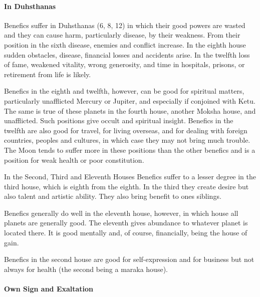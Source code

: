  

\paragraph{In Duhsthanas}

Benefics suffer in Duhsthanas (6, 8, 12) in which their good powers are wasted and they can cause harm, particularly disease, by their weakness. From their position in the sixth disease, enemies and conflict increase. In the eighth house sudden obstacles, disease, financial losses and accidents arise. In the twelfth loss of fame, weakened vitality, wrong generosity, and time in hospitals, prisons, or retirement from life is likely.

 

Benefics in the eighth and twelfth, however, can be good for spiritual matters, particularly unafflicted Mercury or Jupiter, and especially if conjoined with Ketu. The same is true of these planets in the fourth house, another Moksha house, and unafflicted. Such positions give occult and spiritual insight. Benefics in the twelfth are also good for travel, for living overseas, and for dealing with foreign countries, peoples and cultures, in which case they may not bring much trouble. The Moon tends to suffer more in these positions than the other benefics and is a position for weak health or poor constitution.

 

In the Second, Third and Eleventh Houses Benefics suffer to a lesser degree in the third house, which is eighth from the eighth. In the third they create desire but also talent and artistic ability. They also bring benefit to ones siblings.

 

Benefics generally do well in the eleventh house, however, in which house all planets are generally good. The eleventh gives abundance to whatever planet is located there. It is good mentally and, of course, financially, being the house of gain.

 

Benefics in the second house are good for self-expression and for business but not always for health (the second being a maraka house).

 

\paragraph{Own Sign and Exaltation}

